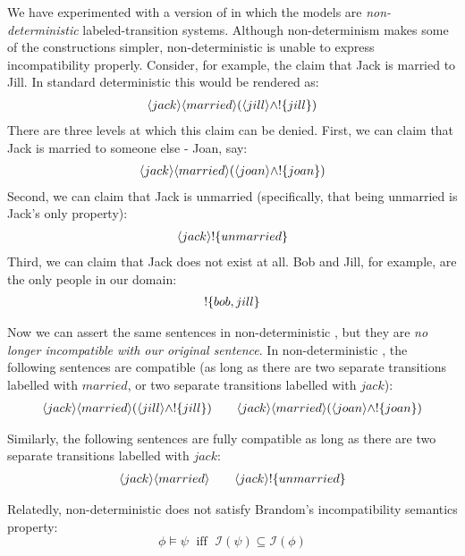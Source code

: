 We have experimented with a version of \cathoristic{} in which the models are
\emph{non-deterministic} labeled-transition systems.  Although
non-determinism makes some of the constructions simpler,
non-deterministic \cathoristic{} is unable to express incompatibility properly.
Consider, for example, the claim that Jack is married to Jill. 
In standard deterministic \cathoristic{} this would be rendered as:
\begin{eqnarray*}
  \langle jack \rangle \langle married \rangle (\langle jill \rangle \land ! \{jill\})
\end{eqnarray*}
There are three levels at which this claim can be denied.
First, we can claim that Jack is married to someone else - Joan, say:
\begin{eqnarray*}
   \langle jack \rangle \langle married \rangle (\langle joan \rangle \land ! \{joan\})
\end{eqnarray*}
Second, we can claim that Jack is unmarried (specifically, that being unmarried is Jack's only property):
\begin{eqnarray*}
  \langle jack \rangle !\{unmarried\}
\end{eqnarray*}
Third, we can claim that Jack does not exist at all. Bob and Jill, for example, are the only people in our domain:
\begin{eqnarray*}
  ! \{bob, jill\}
\end{eqnarray*}

Now we can assert the same sentences in non-deterministic \cathoristic{}, but they
are \emph{no longer incompatible with our original sentence}.  In
non-deterministic \cathoristic{}, the following sentences are compatible (as long
as there are two separate transitions labelled with $married$, or two
separate transitions labelled with $jack$):
\begin{eqnarray*}
  \langle jack \rangle \langle married \rangle (\langle jill \rangle \land ! \{jill\}) 
      \qquad
  \langle jack \rangle \langle married \rangle (\langle joan \rangle \land ! \{joan\})
\end{eqnarray*}

\NI Similarly, the following sentences are fully compatible as long as
there are two separate transitions labelled with $jack$:
\begin{eqnarray*}
  \langle jack \rangle \langle married \rangle \qquad
  \langle jack \rangle ! \{unmarried\}
\end{eqnarray*}

\NI Relatedly, non-deterministic \cathoristic{} does not satisfy Brandom's
incompatibility semantics property:
\[
   \phi \models \psi \; \mbox{ iff } \; \mathcal{I}(\psi) \subseteq \mathcal{I}(\phi)
\]

